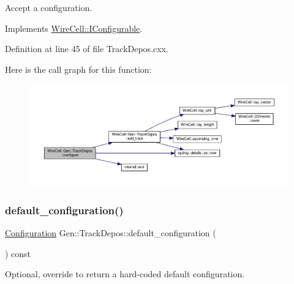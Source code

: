 Accept a configuration. 



Implements \hyperlink{class_wire_cell_1_1_i_configurable_a57ff687923a724093df3de59c6ff237d}{Wire\+Cell\+::\+I\+Configurable}.



Definition at line 45 of file Track\+Depos.\+cxx.

Here is the call graph for this function\+:
\nopagebreak
\begin{figure}[H]
\begin{center}
\leavevmode
\includegraphics[width=350pt]{class_wire_cell_1_1_gen_1_1_track_depos_a0a3e984c40fe60a0b8fbd451091a008b_cgraph}
\end{center}
\end{figure}
\mbox{\label{class_wire_cell_1_1_gen_1_1_track_depos_ad96354353f477b5efeed326167b5b531}} 
\subsubsection{\texorpdfstring{default\+\_\+configuration()}{default\_configuration()}}
{\footnotesize\ttfamily \hyperlink{namespace_wire_cell_a9f705541fc1d46c608b3d32c182333ee}{Configuration} Gen\+::\+Track\+Depos\+::default\+\_\+configuration (\begin{DoxyParamCaption}{ }\end{DoxyParamCaption}) const\hspace{0.3cm}{\ttfamily [virtual]}}



Optional, override to return a hard-\/coded default configuration. 



